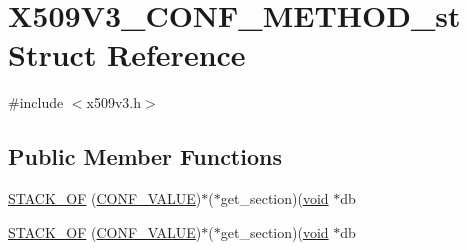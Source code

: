 \hypertarget{struct_x509_v3___c_o_n_f___m_e_t_h_o_d__st}{}\section{X509\+V3\+\_\+\+C\+O\+N\+F\+\_\+\+M\+E\+T\+H\+O\+D\+\_\+st Struct Reference}
\label{struct_x509_v3___c_o_n_f___m_e_t_h_o_d__st}


{\ttfamily \#include $<$x509v3.\+h$>$}

\subsection*{Public Member Functions}
\begin{DoxyCompactItemize}
\item 
\hyperlink{struct_x509_v3___c_o_n_f___m_e_t_h_o_d__st_a1e9106830d55c22aed10737bb2de5f6a}{S\+T\+A\+C\+K\+\_\+\+OF} (\hyperlink{struct_c_o_n_f___v_a_l_u_e}{C\+O\+N\+F\+\_\+\+V\+A\+L\+UE})$\ast$($\ast$get\+\_\+section)(\hyperlink{hw__4758__cca_8h_afad4d591c7931ff6dc5bf69c76c96aa0}{void} $\ast$db
\item 
\hyperlink{struct_x509_v3___c_o_n_f___m_e_t_h_o_d__st_a1e9106830d55c22aed10737bb2de5f6a}{S\+T\+A\+C\+K\+\_\+\+OF} (\hyperlink{struct_c_o_n_f___v_a_l_u_e}{C\+O\+N\+F\+\_\+\+V\+A\+L\+UE})$\ast$($\ast$get\+\_\+section)(\hyperlink{hw__4758__cca_8h_afad4d591c7931ff6dc5bf69c76c96aa0}{void} $\ast$db
\end{DoxyCompactItemize}

